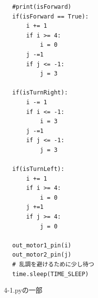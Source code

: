 \documentclass{ltjsarticle} %
\begin{document}
\begin{mdframed}
\begin{verbatim}
        #print(isForward)    
        if(isForward == True):
            i += 1
            if i >= 4:
                i = 0
            j -=1
            if j <= -1:
                j = 3    
    
        if(isTurnRight):
            i -= 1
            if i <= -1:
                i = 3
            j -=1
            if j <= -1:
                j = 3  
    
        if(isTurnLeft):
            i += 1
            if i >= 4:
                i = 0
            j +=1
            if j >= 4:
                j = 0
                          
        out_motor1_pin(i)
        out_motor2_pin(j)
        # 乱調を避けるために少し待つ
        time.sleep(TIME_SLEEP) 	
  \end{verbatim}
  \end{mdframed}
  \begin{figure}[H]
  \caption{4-1.pyの一部}
  \label{fig:4-1py}
\end{figure}
\end{document}
